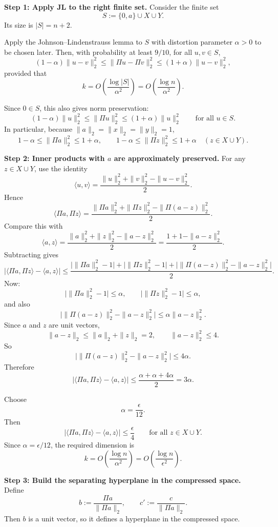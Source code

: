 \documentclass[10pt]{article}
\begin{document}
\medskip
\textbf{Step 1: Apply JL to the right finite set.}
Consider the finite set
\[
S := \{0,a\}\cup X\cup Y.
\]
Its size is $|S|=n+2$.

Apply the Johnson--Lindenstrauss lemma to $S$ with distortion parameter $\alpha>0$ to be chosen later. Then, with probability at least $9/10$, for all $u,v\in S$,
\[
(1-\alpha)\|u-v\|_2^2 \le \|\Pi u-\Pi v\|_2^2 \le (1+\alpha)\|u-v\|_2^2,
\]
provided that
\[
k = O\!\left(\frac{\log |S|}{\alpha^2}\right)
= O\!\left(\frac{\log n}{\alpha^2}\right).
\]

Since $0\in S$, this also gives norm preservation:
\[
(1-\alpha)\|u\|_2^2 \le \|\Pi u\|_2^2 \le (1+\alpha)\|u\|_2^2
\qquad \text{for all }u\in S.
\]
In particular, because $\|a\|_2=\|x\|_2=\|y\|_2=1$,
\[
1-\alpha \le \|\Pi a\|_2^2 \le 1+\alpha,
\qquad
1-\alpha \le \|\Pi z\|_2^2 \le 1+\alpha
\quad (z\in X\cup Y).
\]

\medskip
\textbf{Step 2: Inner products with $a$ are approximately preserved.}
For any $z\in X\cup Y$, use the identity
\[
\langle u,v\rangle
=
\frac{\|u\|_2^2+\|v\|_2^2-\|u-v\|_2^2}{2}.
\]
Hence
\[
\langle \Pi a,\Pi z\rangle
=
\frac{\|\Pi a\|_2^2+\|\Pi z\|_2^2-\|\Pi(a-z)\|_2^2}{2}.
\]
Compare this with
\[
\langle a,z\rangle
=
\frac{\|a\|_2^2+\|z\|_2^2-\|a-z\|_2^2}{2}
=
\frac{1+1-\|a-z\|_2^2}{2}.
\]
Subtracting gives
\[
\big|\langle \Pi a,\Pi z\rangle - \langle a,z\rangle\big|
\le
\frac{
\big|\|\Pi a\|_2^2-1\big|
+
\big|\|\Pi z\|_2^2-1\big|
+
\big|\|\Pi(a-z)\|_2^2-\|a-z\|_2^2\big|
}{2}.
\]
Now:
\[
\big|\|\Pi a\|_2^2-1\big|\le \alpha,
\qquad
\big|\|\Pi z\|_2^2-1\big|\le \alpha,
\]
and also
\[
\big|\|\Pi(a-z)\|_2^2-\|a-z\|_2^2\big|
\le
\alpha \|a-z\|_2^2.
\]
Since $a$ and $z$ are unit vectors,
\[
\|a-z\|_2 \le \|a\|_2+\|z\|_2 = 2,
\qquad
\|a-z\|_2^2 \le 4.
\]
So
\[
\big|\|\Pi(a-z)\|_2^2-\|a-z\|_2^2\big|\le 4\alpha.
\]
Therefore
\[
\big|\langle \Pi a,\Pi z\rangle - \langle a,z\rangle\big|
\le
\frac{\alpha+\alpha+4\alpha}{2}
=
3\alpha.
\]

Choose
\[
\alpha = \frac{\epsilon}{12}.
\]
Then
\[
\boxed{
\big|\langle \Pi a,\Pi z\rangle - \langle a,z\rangle\big|
\le \frac{\epsilon}{4}
\qquad \text{for all } z\in X\cup Y.
}
\]
Since $\alpha=\epsilon/12$, the required dimension is
\[
k = O\!\left(\frac{\log n}{\alpha^2}\right)
= O\!\left(\frac{\log n}{\epsilon^2}\right).
\]

\medskip
\textbf{Step 3: Build the separating hyperplane in the compressed space.}
Define
\[
b := \frac{\Pi a}{\|\Pi a\|_2},
\qquad
c' := \frac{c}{\|\Pi a\|_2}.
\]
Then $b$ is a unit vector, so it defines a hyperplane in the compressed space.
\end{document}
